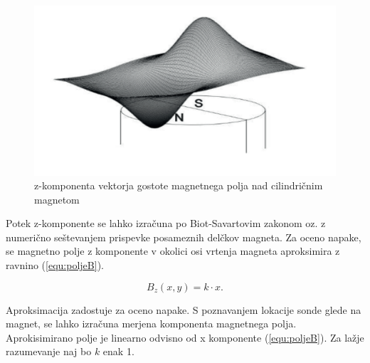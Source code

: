 


\begin{figure}[h]
	\centering
		\includegraphics[width=0.75\columnwidth]{./Slike/magnetno_polje.jpg}
	\caption{z-komponenta vektorja gostote magnetnega polja nad cilindričnim magnetom \cite{AM8192}}
	\label{fig:magnetno_polje}
\end{figure}


Potek z-komponente se lahko izračuna po Biot-Savartovim zakonom oz. z numerično seštevanjem prispevke posameznih delčkov magneta. Za oceno napake, se magnetno polje z komponente v okolici osi vrtenja magneta aproksimira z ravnino (\ref{equ:poljeB}).

\begin{equation}
\label{equ:poljeB1}
B_z(x,y)=k\cdot x.
\end{equation}

Aproksimacija zadostuje za oceno napake. S poznavanjem lokacije sonde glede na magnet, se lahko izračuna merjena komponenta magnetnega polja. Aprokisimirano polje je linearno odvisno od x komponente (\ref{equ:poljeB}). Za lažje razumevanje naj bo $k$ enak 1.

